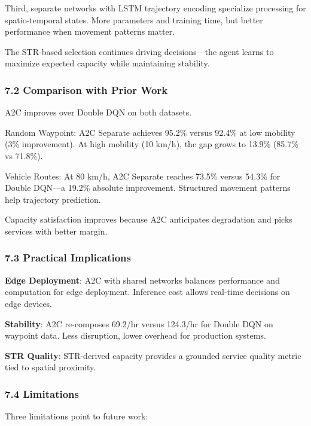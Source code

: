 \documentclass[
  10pt,
  twocolumn,
]{article}
\begin{document}
Third, separate networks with LSTM trajectory encoding specialize
processing for spatio-temporal states. More parameters and training
time, but better performance when movement patterns matter.

The STR-based selection continues driving decisions---the agent learns
to maximize expected capacity while maintaining stability.

\hypertarget{comparison-with-prior-work}{%
	\subsubsection{7.2 Comparison with Prior
		Work}\label{comparison-with-prior-work}}

A2C improves over Double DQN on both datasets.

Random Waypoint: A2C Separate achieves 95.2\% versus 92.4\% at low
mobility (3\% improvement). At high mobility (10 km/h), the gap grows to
13.9\% (85.7\% vs 71.8\%).

Vehicle Routes: At 80 km/h, A2C Separate reaches 73.5\% versus 54.3\%
for Double DQN---a 19.2\% absolute improvement. Structured movement
patterns help trajectory prediction.

Capacity satisfaction improves because A2C anticipates degradation and
picks services with better margin.

\hypertarget{practical-implications}{%
	\subsubsection{7.3 Practical
		Implications}\label{practical-implications}}

\textbf{Edge Deployment}: A2C with shared networks balances performance
and computation for edge deployment. Inference cost allows real-time
decisions on edge devices.

\textbf{Stability}: A2C re-composes 69.2/hr versus 124.3/hr for Double
DQN on waypoint data. Less disruption, lower overhead for production
systems.

\textbf{STR Quality}: STR-derived capacity provides a grounded service
quality metric tied to spatial proximity.

\hypertarget{limitations}{%
	\subsubsection{7.4 Limitations}\label{limitations}}

Three limitations point to future work:
\end{document}
